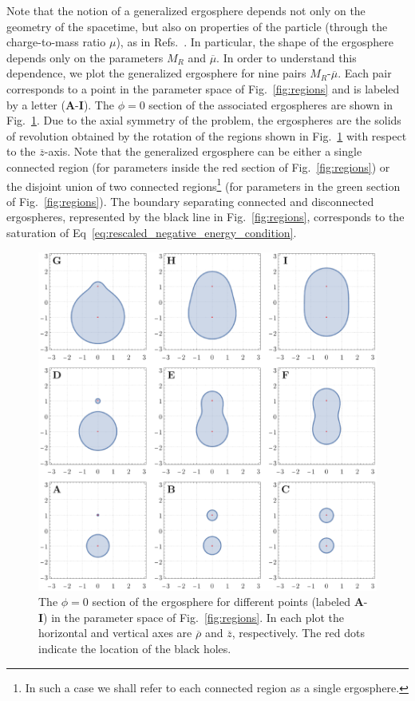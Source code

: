 Note that the notion of a generalized ergosphere depends not only on the geometry of the spacetime, but also on properties of the particle (through the charge-to-mass ratio $\mu$), as in Refs.~\cite{RUFFINI1971,DENARDO1973}. In particular, the shape of the ergosphere depends only on the parameters $M_R$ and $\overline \mu$. In order to understand this dependence, we plot the generalized ergosphere for nine pairs $M_R$-$\overline \mu$. Each pair corresponds to a point in the parameter space of Fig.~\ref{fig:regions} and is labeled by a letter (\textbf{A}-\textbf{I}). The $\phi=0$ section of the associated ergospheres
are shown in Fig.~\ref{fig:ergos}. Due to the axial symmetry of the problem, the ergospheres are the solids of revolution obtained by the rotation of the regions shown in Fig.~\ref{fig:ergos} with respect to the $\overline z$-axis. Note that the generalized ergosphere can be either a single connected region (for parameters inside the red section of Fig.~\ref{fig:regions}) or the disjoint union of two connected regions\footnote{In such a case we shall refer to each connected region as a single ergosphere.} (for parameters in the green section of Fig.~\ref{fig:regions}). The boundary separating connected and disconnected ergospheres, represented by the black line in Fig.~\ref{fig:regions}, corresponds to the saturation of Eq~\eqref{eq:rescaled_negative_energy_condition}.




\begin{figure}[!htbp]
    \centering
    \includegraphics[scale=0.70]{img/penrose_binaries/fig2.pdf}
    \caption{The $\phi=0$ section of the ergosphere for different points (labeled \textbf{A}-\textbf{I}) in the parameter space of Fig.~\ref{fig:regions}. In each plot the horizontal and vertical axes are $\overline \rho$ and $\overline z$, respectively. The red dots indicate the location of the black holes.}
    \label{fig:ergos}
\end{figure}



